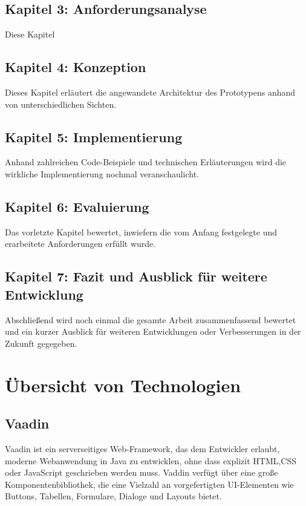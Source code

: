 \documentclass[a4paper,12pt]{scrreprt}
\begin{document}
\section*{\small \textbf{Kapitel 3: Anforderungsanalyse}}
Diese Kapitel 
\section*{\small \textbf{Kapitel 4: Konzeption}}
Dieses Kapitel erläutert die angewandete Architektur des Prototypens anhand von unterschiedlichen Sichten.
\section*{\small \textbf{Kapitel 5: Implementierung}}
Anhand zahlreichen Code-Beispiele und technischen Erläuterungen wird die wirkliche Implementierung nochmal veranschaulicht. 
\section*{\small \textbf{Kapitel 6: Evaluierung}}
Das vorletzte Kapitel bewertet, inwiefern die vom Anfang festgelegte und erarbeitete Anforderungen erfüllt wurde. 
\section*{\small \textbf{Kapitel 7: Fazit und Ausblick für weitere Entwicklung}}
Abschließend wird noch einmal die gesamte Arbeit zusammenfassend bewertet und ein kurzer Ausblick für weiteren Entwicklungen oder Verbesserungen in der Zukunft gegegeben.

\chapter{Übersicht von Technologien}
\section{Vaadin}
Vaadin ist ein serverseitiges Web-Framework, das dem Entwickler erlaubt, moderne Webanwendung in Java zu entwicklen, ohne dass explizit HTML,CSS oder JavaScript geschrieben werden muss. Vaddin verfügt über eine große Komponentenbibliothek, die eine Vielzahl an vorgefertigten UI-Elementen wie Buttons, Tabellen, Formulare, Dialoge und Layouts bietet.
\end{document}
